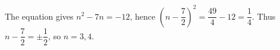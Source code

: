 The equation gives $n^2-7n=-12$, hence $(n-\dfrac{7}{2})^2=\dfrac{49}{4}-12=\dfrac{1}{4}$. Thus $n-\dfrac{7}{2}=\pm\dfrac{1}{2}$, so $\boxed{n=3,4}$.

